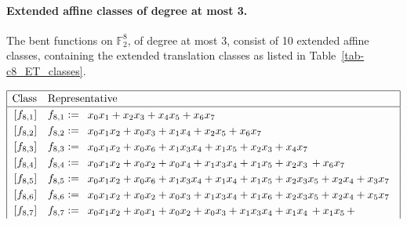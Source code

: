\documentclass[12pt,a4paper]{article}
\newcommand{\mb}[1]{\mathbb{#1}}
\newcommand{\F}{\mb{F}}
\begin{document}
\paragraph*{Extended affine classes of degree at most 3.}
%
The bent functions on $\F_2^8$, of degree at most 3, consist of 10
extended affine classes, containing the extended translation classes as listed in Table~\ref{tab-c8_ET_classes}.
\begin{table}[!bhpt] %
\small{}
\begin{align*}
\def\arraystretch{1.2}
\begin{array}{|cl|}
\hline
\text{Class} &
\text{Representative}
\\
\hline
\,[f_{ 8 , 1 }] & f_{ 8 , 1 } :=
\begin{array}{l}
x_{0} x_{1} + x_{2} x_{3} + x_{4} x_{5} + x_{6} x_{7}
\end{array}
\\
\,[f_{ 8 , 2 }] & f_{ 8 , 2 } :=
\begin{array}{l}
x_{0} x_{1} x_{2} + x_{0} x_{3} + x_{1} x_{4} + x_{2} x_{5} + x_{6} x_{7}
\end{array}
\\
\,[f_{ 8 , 3 }] & f_{ 8 , 3 } :=
\begin{array}{l}
x_{0} x_{1} x_{2} + x_{0} x_{6} + x_{1} x_{3} x_{4} + x_{1} x_{5} + x_{2} x_{3} + x_{4} x_{7}
\end{array}
\\
\,[f_{ 8 , 4 }] & f_{ 8 , 4 } :=
\begin{array}{l}
x_{0} x_{1} x_{2} + x_{0} x_{2} + x_{0} x_{4} + x_{1} x_{3} x_{4} + x_{1} x_{5} + x_{2} x_{3}\, +
x_{6} x_{7}
\end{array}
\\
\,[f_{ 8 , 5 }] & f_{ 8 , 5 } :=
\begin{array}{l}
x_{0} x_{1} x_{2} + x_{0} x_{6} + x_{1} x_{3} x_{4} + x_{1} x_{4} + x_{1} x_{5} + x_{2} x_{3} x_{5}
+ x_{2} x_{4} + x_{3} x_{7}
\end{array}
\\
\,[f_{ 8 , 6 }] & f_{ 8 , 6 } :=
\begin{array}{l}
x_{0} x_{1} x_{2} + x_{0} x_{2} + x_{0} x_{3} + x_{1} x_{3} x_{4} + x_{1} x_{6} + x_{2} x_{3} x_{5}
+ x_{2} x_{4} + x_{5} x_{7}
\end{array}
\\
\,[f_{ 8 , 7 }] & f_{ 8 , 7 } :=
\begin{array}{l}
x_{0} x_{1} x_{2} + x_{0} x_{1} + x_{0} x_{2} + x_{0} x_{3} + x_{1} x_{3} x_{4} + x_{1} x_{4}\, +
x_{1} x_{5}\, +

\end{array}
\end{array}
\end{align*}
\end{table}
\end{document}
